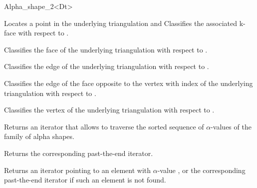 \begin{ccRefClass} {Alpha_shape_2<Dt>}
%



{Locates a point   in the underlying triangulation and Classifies the 
associated k-face with respect to \ccVar.}

{Classifies the face  of the underlying triangulation with respect to \ccVar.}

{Classifies the edge  of the underlying triangulation with respect to \ccVar.}

{Classifies the edge of the face  opposite to the vertex with index
of the underlying triangulation with respect to \ccVar.}	

{Classifies the vertex  of the underlying triangulation with respect to \ccVar.}



{Returns an iterator that allows to traverse the
sorted sequence of $\alpha$-values of the family of alpha shapes.}

{Returns the corresponding past-the-end iterator.}

{Returns an iterator pointing to an element with $\alpha$-value
, or the corresponding past-the-end iterator if such 
an element is not found.}


\end{ccRefClass}

